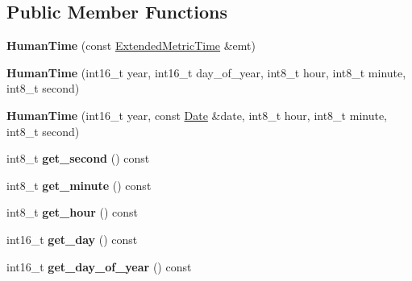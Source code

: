 \subsection*{Public Member Functions}
\begin{DoxyCompactItemize}
\item 
\mbox{\label{classtime_1_1_human_time_aa2c2be768d9a2ce1997118ba580ef3c6}} 
{\bfseries Human\+Time} (const \mbox{\hyperlink{classtime_1_1_extended_metric_time}{Extended\+Metric\+Time}} \&emt)
\item 
\mbox{\label{classtime_1_1_human_time_ac9c558580d0532053b7449ea0654f825}} 
{\bfseries Human\+Time} (int16\+\_\+t year, int16\+\_\+t day\+\_\+of\+\_\+year, int8\+\_\+t hour, int8\+\_\+t minute, int8\+\_\+t second)
\item 
\mbox{\label{classtime_1_1_human_time_a966d7d3b52b4bbdd921634b42d4472cd}} 
{\bfseries Human\+Time} (int16\+\_\+t year, const \mbox{\hyperlink{structtime_1_1_human_time_1_1_date}{Date}} \&date, int8\+\_\+t hour, int8\+\_\+t minute, int8\+\_\+t second)
\item 
\mbox{\label{classtime_1_1_human_time_a33788abfd0ed8dda26f8d2c09fba3a06}} 
int8\+\_\+t {\bfseries get\+\_\+second} () const
\item 
\mbox{\label{classtime_1_1_human_time_ab32a7e1a2158c26a3a95612d72de39b2}} 
int8\+\_\+t {\bfseries get\+\_\+minute} () const
\item 
\mbox{\label{classtime_1_1_human_time_ae5db0d6dedd9aa9def8f96903693d179}} 
int8\+\_\+t {\bfseries get\+\_\+hour} () const
\item 
\mbox{\label{classtime_1_1_human_time_a4091f40a1449fd0ee828d704c7bf7254}} 
int16\+\_\+t {\bfseries get\+\_\+day} () const
\item 
\mbox{\label{classtime_1_1_human_time_a9c22391946be51853a8208154f4164c9}} 
int16\+\_\+t {\bfseries get\+\_\+day\+\_\+of\+\_\+year} () const
\item 
\mbox{\label{classtime_1_1_human_time_a4b242d19de9e0c8a30794e016e6e8558}} 

\end{DoxyCompactItemize}
